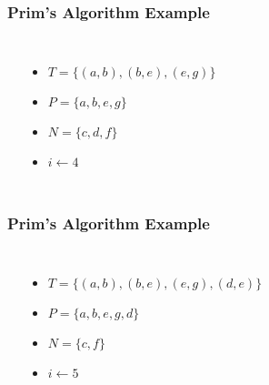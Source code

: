 \documentclass[dvipsnames]{beamer}
\begin{document}
\begin{frame}
  \frametitle{Prim's Algorithm Example}

  \begin{example}[$3 < 7$]
    \begin{columns}
      \begin{center}
      \end{center}

      \pause
      \begin{itemize}
        \item $T = \{ (a,b), (b,e), (e,g) \}$
        \item $P = \{ a, b, e, g \}$
        \item $N = \{ c, d, f \}$
        \item $i \leftarrow 4$
      \end{itemize}
    \end{columns}
  \end{example}
\end{frame}

\begin{frame}
  \frametitle{Prim's Algorithm Example}

  \begin{example}[$4 < 7$]
    \begin{columns}
      \begin{center}
      \end{center}

      \pause
      \begin{itemize}
        \item $T = \{ (a,b), (b,e), (e,g), (d,e) \}$
        \item $P = \{ a, b, e, g, d \}$
        \item $N = \{ c, f \}$
        \item $i \leftarrow 5$
      \end{itemize}
    \end{columns}
  \end{example}
\end{frame}
\end{document}
